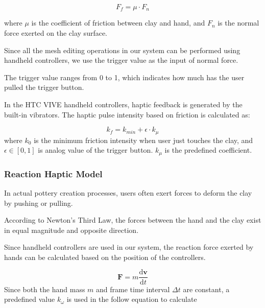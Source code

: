 \documentclass{svjour3}                     %
\begin{document}
\begin{equation}
F_{f} = \mu \cdot F_{n}
\end{equation}

where $\mu$ is the coefficient of friction between clay and hand, and $F_{n}$ is the normal force exerted on the clay surface.

Since all the mesh editing operations in our system can be performed using handheld controllers, we use the trigger value as the input of normal force.

The trigger value ranges from 0 to 1, which indicates how much has the user pulled the trigger button.


In the HTC VIVE handheld controllers, haptic feedback is generated by the built-in vibrators.
The haptic pulse intensity based on friction is calculated as:

\begin{equation}
k_{f} = k_{min} + \epsilon \cdot k_{\mu}
\end{equation}
where $k_{0}$ is the minimum friction intensity when user just touches the clay, and $\epsilon \in [0,1]$ is analog value of the trigger button. $k_{\mu}$ is the predefined coefficient.




















\subsubsection{Reaction Haptic Model}

In actual pottery creation processes, users often exert forces to deform the clay by pushing or pulling.

According to Newton's Third Law, the forces between the hand and the clay exist in equal magnitude and opposite direction.

Since handheld controllers are used in our system, the reaction force exerted by hands can be calculated based on the position of the controllers.

\begin{equation}
\mathbf{F} = m \frac{\mathrm{d} \mathbf{v}}{\mathrm{d} t}
\end{equation}
Since both the hand mass $m$ and frame time interval $\Delta t$ are constant, a predefined value $k_{\omega}$ is used in the follow equation to calculate 
\end{document}
